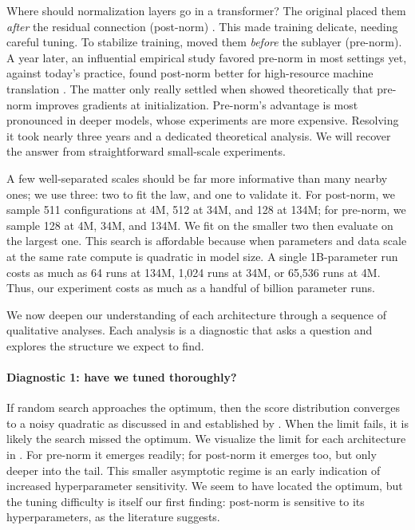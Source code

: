 Where should normalization layers go in a transformer? The original placed them \emph{after} the residual connection (post-norm) \citep{Vaswani2017Attention}. This made training delicate, needing careful tuning. To stabilize training, \citet{baevski2018adaptiveinputrepresentationsneural} moved them \emph{before} the sublayer (pre-norm). A year later, an influential empirical study favored pre-norm in most settings yet, against today's practice, found post-norm better for high-resource machine translation \citep{nguyen-salazar-2019-transformers}. The matter only really settled when \citet{Xiong2020OnLayer} showed theoretically that pre-norm improves gradients at initialization. Pre-norm's advantage is most pronounced in deeper models, whose experiments are more expensive. Resolving it took nearly three years and a dedicated theoretical analysis. We will recover the answer from straightforward small-scale experiments.

A few well-separated scales should be far more informative than many nearby ones; we use three: two to fit the law, and one to validate it. For post-norm, we sample 511 configurations at 4M, 512 at 34M, and 128 at 134M; for pre-norm, we sample 128 at 4M, 34M, and 134M. We fit on the smaller two then evaluate on the largest one. This search is affordable because when parameters and data scale at the same rate compute is quadratic in model size. A single 1B-parameter run costs as much as 64 runs at 134M, 1{,}024 runs at 34M, or 65{,}536 runs at 4M. Thus, our experiment costs as much as a handful of billion parameter runs.

We now deepen our understanding of each architecture through a sequence of qualitative analyses. Each analysis is a diagnostic that asks a question and explores the structure we expect to find.

\paragraph{Diagnostic 1: have we tuned thoroughly?} If random search approaches the optimum, then the score distribution converges to a noisy quadratic as discussed in  and established by \citet{lourie2025hyperparameter}. When the limit fails, it is likely the search missed the optimum.
We visualize the limit for each architecture in . For pre-norm it emerges readily; for post-norm it emerges too, but only deeper into the tail. This smaller asymptotic regime is an early indication of increased hyperparameter sensitivity. We seem to have located the optimum, but the tuning difficulty is itself our first finding: post-norm is sensitive to its hyperparameters, as the literature suggests.



